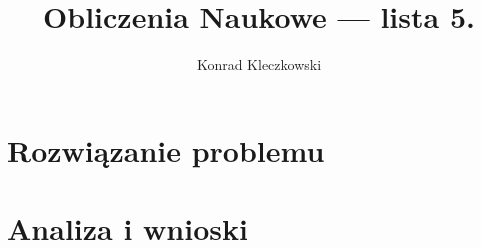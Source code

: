 \documentclass{mwrep}
\title{Obliczenia Naukowe --- lista 5.}
\author{Konrad Kleczkowski}
\begin{document}
  \maketitle
  \tableofcontents
  
  
   
  \chapter{Rozwiązanie problemu}

  \chapter{Analiza i wnioski}

  \listofalgorithms
  \listoffigures
  \listoftables
\end{document}
